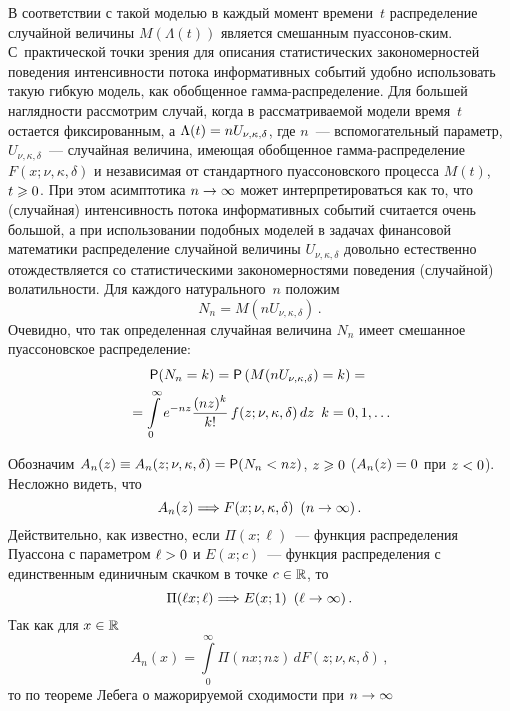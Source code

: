\begin{multicols}{2}
В соответствии с такой моделью в каждый момент времени~$t$
распределение случайной величины $M(\Lambda(t))$ является смешанным
пуассонов-\linebreak ским. С~практической точки зрения для описания\linebreak
статистических закономерностей поведения интенсивности потока
информативных событий удобно использо\-вать такую гибкую модель, как
обобщенное гам\-ма-рас\-пре\-де\-ле\-ние. Для большей наглядности рассмотрим
случай, когда в рас\-смат\-ри\-ва\-емой модели время~$t$ остается
фиксированным, а $\Lambda(t)\hm=nU_{\nu,\kappa,\delta}$, где $n$~---
вспомогательный параметр, $U_{\nu,\kappa,\delta}$~--- случайная
величина, имеющая обобщенное гам\-ма-рас\-пре\-де\-ле\-ние
$F(x;\nu,\kappa,\delta)$ и независимая от стандартного
пуассоновского процесса $M(t)$, $t\hm\geqslant0$. При этом асимптотика
$n\hm\to\infty$ может интерпретироваться как то, что (случайная)
интенсивность потока информативных событий считается очень большой,
а при использовании подобных\linebreak
 моделей в задачах финансовой математики
рас\-пределение случайной величины $U_{\nu,\kappa,\delta}$ довольно\linebreak
естественно отождествляется со статистическими закономерностями
поведения (случайной) волатильности. Для каждого натурального~$n$
положим
$$
N_n=M\left(nU_{\nu,\kappa,\delta}\right)\,.
$$
Очевидно, что так определенная случайная величина $N_n$ имеет
смешанное пуассоновское распределение:
\begin{multline}
{\sf P}(N_n=k)={\sf
P}\left(M(nU_{\nu,\kappa,\delta})=k\right)={}\\
{}=
\int\limits_0^{\infty}e^{-nz}\displaystyle\frac{\displaystyle (nz)^k\mathstrut}{\displaystyle k!\mathstrut}\,f(z;\nu,\kappa,\delta)\,dz\enskip
k=0,1,\ldots\label{e13-kor}
\end{multline}

Обозначим $A_n(z)\equiv A_n(z;\nu,\kappa,\delta)\hm={\sf P}(N_n\hm<nz)$,
$z\hm\geqslant0$ ($A_n(z)\hm=0$ при $z\hm<0$). Несложно видеть, что
$$
A_n(z)\Longrightarrow F(x;\nu,\kappa,\delta)\enskip (n\to\infty)\,.
$$
Действительно, как известно, если $\Pi(x;\ell)$~--- функция
распределения Пуассона с параметром $\ell\hm>0$ и $E(x;c)$~--- функция
распределения с единственным единичным скачком в точке $c\hm\in\r$, то
$$
\Pi(\ell x;\ell)\Longrightarrow E(x;1)\enskip (\ell\to\infty)\,.
$$
Так как для $x\hm\in\r$
$$
A_n(x)=\int\limits_{0}^{\infty}\Pi(n x; n z)\,dF(z;\nu,\kappa,\delta)\,,
$$
то по теореме Лебега о мажорируемой сходимости при $n\hm\to\infty$


\end{multicols}
